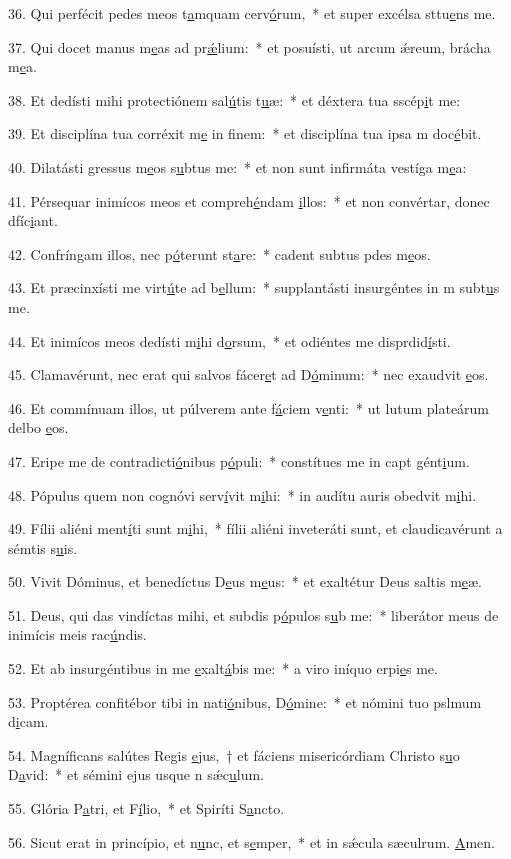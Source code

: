 36. Qui perfécit pedes meos t\uline{a}mquam cerv\uline{ó}rum,~* et super excélsa sttu\uline{e}ns me.\par 
37. Qui docet manus m\uline{e}as ad pr\uline{ǽ}lium:~* et posuísti, ut arcum ǽreum, brácha m\uline{e}a.\par 
38. Et dedísti mihi protectiónem sal\uline{ú}tis t\uline{u}æ:~* et déxtera tua sscép\uline{i}t me:\par 
39. Et disciplína tua corréxit m\uline{e} in f\uline{i}nem:~* et disciplína tua ipsa m doc\uline{é}bit.\par 
40. Dilatásti gressus m\uline{e}os s\uline{u}btus me:~* et non sunt infirmáta vestíga m\uline{e}a:\par 
41. Pérsequar inimícos meos et compreh\uline{é}ndam \uline{i}llos:~* et non convértar, donec dfíc\uline{i}ant.\par 
42. Confríngam illos, nec p\uline{ó}terunt st\uline{a}re:~* cadent subtus pdes m\uline{e}os.\par 
43. Et præcinxísti me virt\uline{ú}te ad b\uline{e}llum:~* supplantásti insurgéntes in m subt\uline{u}s me.\par 
44. Et inimícos meos dedísti m\uline{i}hi d\uline{o}rsum,~* et odiéntes me disprdid\uline{í}sti.\par 
45. Clamavérunt, nec erat qui salvos fácer\uline{e}t ad D\uline{ó}minum:~* nec exaudvit \uline{e}os.\par 
46. Et commínuam illos, ut púlverem ante f\uline{á}ciem v\uline{e}nti:~* ut lutum plateárum delbo \uline{e}os.\par 
47. Eripe me de contradicti\uline{ó}nibus p\uline{ó}puli:~* constítues me in capt gént\uline{i}um.\par 
48. Pópulus quem non cognóvi serv\uline{í}vit m\uline{i}hi:~* in audítu auris obedvit m\uline{i}hi.\par 
49. Fílii aliéni ment\uline{í}ti sunt m\uline{i}hi,~* fílii aliéni inveteráti sunt, et claudicavérunt a sémtis s\uline{u}is.\par 
50. Vivit Dóminus, et benedíctus D\uline{e}us m\uline{e}us:~* et exaltétur Deus saltis m\uline{e}æ.\par 
51. Deus, qui das vindíctas mihi, et subdis p\uline{ó}pulos s\uline{u}b me:~* liberátor meus de inimícis meis rac\uline{ú}ndis.\par 
52. Et ab insurgéntibus in me \uline{e}xalt\uline{á}bis me:~* a viro iníquo erpi\uline{e}s me.\par 
53. Proptérea confitébor tibi in nati\uline{ó}nibus, D\uline{ó}mine:~* et nómini tuo pslmum d\uline{i}cam.\par 
54. Magníficans salútes Regis \uline{e}jus,~† et fáciens misericórdiam Christo s\uline{u}o D\uline{a}vid:~* et sémini ejus usque n sǽc\uline{u}lum.\par 
55. Glória P\uline{a}tri, et F\uline{í}lio,~* et Spiríti S\uline{a}ncto.\par 
56. Sicut erat in princípio, et n\uline{u}nc, et s\uline{e}mper,~* et in sǽcula sæculrum. \uline{A}men.\par 
